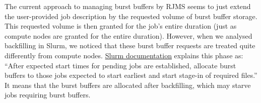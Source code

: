 \documentclass[runningheads]{llncs}
\begin{document}
The current approach to managing burst buffers by RJMS seems to just extend the user-provided job description by the requested volume of burst buffer storage. This requested volume is then granted for the job's entire duration (just as compute nodes are granted for the entire duration). However, when we analysed backfilling in Slurm, we noticed that these burst buffer requests are treated quite differently from compute nodes. \href{https://slurm.schedmd.com/burst_buffer.html}{Slurm documentation} explains this phase as: ``After expected start times for pending jobs are established, allocate burst buffers to those jobs expected to start earliest and start stage-in of required files.'' It means that the burst buffers are allocated after backfilling, which may starve jobs requiring burst buffers. 

\end{document}
